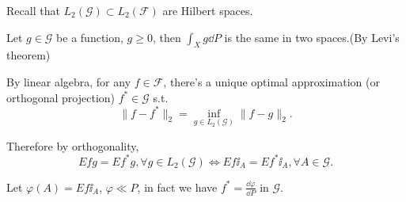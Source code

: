 Recall that $L_2(\mathscr{G}) \subset L_2(\mathscr{F})$ are Hilbert spaces.

Let $g \in \mathscr{G}$ be a function, $g \ge 0$, then $\int_X g\dd P$ is
the same in two spaces.(By Levi's theorem)

By linear algebra, for any $f\in \mathscr{F}$,
there's a unique optimal approximation (or orthogonal projection)
$f^*\in \mathscr{G}$ s.t.
\[
\lVert f - f^* \rVert _2 = \inf_{g\in L_2(\mathscr{G})} \lVert f - g \rVert _2.
\]

Therefore by orthogonality,
\[
Efg = Ef^*g, \forall g\in L_2(\mathscr{G}) \iff Ef\ii_A = Ef^*\ii_A,
\forall A\in \mathscr{G}.
\]

Let $\varphi(A) = Ef\ii_A$,  $\varphi \ll P$,
in fact we have $f^* = \frac{\dd\varphi}{\dd P}$ in $\mathscr{G}$.
